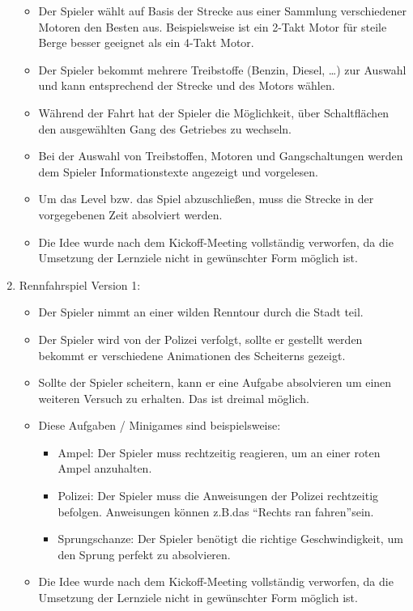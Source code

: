 \begin{enumerate}
\begin{itemize}
			\item{Der Spieler wählt auf Basis der Strecke aus einer Sammlung verschiedener Motoren den Besten aus. Beispielsweise ist ein 2-Takt Motor für steile Berge besser geeignet als ein 4-Takt Motor.}
			\item{Der Spieler bekommt mehrere Treibstoffe (Benzin, Diesel, \dots) zur Auswahl und kann entsprechend der Strecke und des Motors wählen.}
			\item{Während der Fahrt hat der Spieler die Möglichkeit, über Schaltflächen den ausgewählten Gang des Getriebes zu wechseln.}
			\item{Bei der Auswahl von Treibstoffen, Motoren und Gangschaltungen werden dem Spieler Informationstexte angezeigt und vorgelesen.}
			\item{Um das Level bzw. das Spiel abzuschließen, muss die Strecke in der vorgegebenen Zeit absolviert werden.}
			\item{Die Idee wurde nach dem Kickoff-Meeting vollständig verworfen, da die Umsetzung der Lernziele nicht in gewünschter Form möglich ist.}
		\end{itemize}
		\item{Rennfahrspiel Version 1:}
		\begin{itemize}
			\item{Der Spieler nimmt an einer wilden Renntour durch die Stadt teil.}
			\item{Der Spieler wird von der Polizei verfolgt, sollte er gestellt werden bekommt er verschiedene Animationen des Scheiterns gezeigt.}
			\item{Sollte der Spieler scheitern, kann er eine Aufgabe absolvieren um einen weiteren Versuch zu erhalten. Das ist dreimal möglich.}
			\item{Diese Aufgaben / Minigames sind beispielsweise:}
			\begin{itemize}
				\item{Ampel: Der Spieler muss rechtzeitig reagieren, um an einer roten Ampel anzuhalten.}
				\item{Polizei: Der Spieler muss die Anweisungen der Polizei rechtzeitig befolgen. Anweisungen können z.B.\@ das \enquote{Rechts ran fahren}sein.}
				\item{Sprungschanze: Der Spieler benötigt die richtige Geschwindigkeit, um den Sprung perfekt zu absolvieren.}
			\end{itemize}
			\item{Die Idee wurde nach dem Kickoff-Meeting vollständig verworfen, da die Umsetzung der Lernziele nicht in gewünschter Form möglich ist.}
		\end{itemize}
	\end{enumerate}
